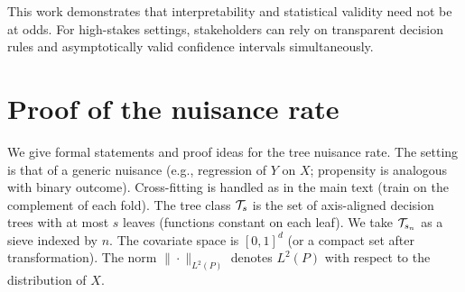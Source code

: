 \documentclass[12pt]{article}
\begin{document}
This work demonstrates that interpretability and statistical validity need not be at odds. For high-stakes settings, stakeholders can rely on transparent decision rules and asymptotically valid confidence intervals simultaneously.

\appendix
\section{Proof of the nuisance rate}
\label{app:nuisance-rate}

We give formal statements and proof ideas for the tree nuisance rate. The setting is that of a generic nuisance (e.g., regression of $Y$ on $X$; propensity is analogous with binary outcome). Cross-fitting is handled as in the main text (train on the complement of each fold). The tree class $\mathcal{T}_s$ is the set of axis-aligned decision trees with at most $s$ leaves (functions constant on each leaf). We take $\mathcal{T}_{s_n}$ as a sieve indexed by $n$. The covariate space is $[0,1]^d$ (or a compact set after transformation). The norm $\|\cdot\|_{L^2(P)}$ denotes $L^2(P)$ with respect to the distribution of $X$.
\end{document}
